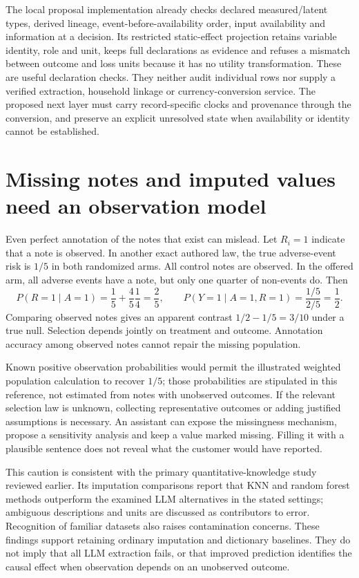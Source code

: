 The local proposal implementation already checks declared measured/latent
types, derived lineage, event-before-availability order, input availability
and information at a decision. Its restricted static-effect projection
retains variable identity, role and unit, keeps full declarations as evidence
and refuses a mismatch between outcome and loss units because it has no
utility transformation. These are useful declaration checks. They neither
audit individual rows nor supply a verified extraction, household linkage or
currency-conversion service.\citep{exec17_ontology_sources}
The proposed next layer must carry record-specific clocks and provenance
through the conversion, and preserve an explicit unresolved state when
availability or identity cannot be established.

\section{Missing notes and imputed values need an observation model}

Even perfect annotation of the notes that exist can mislead. Let
\(R_i=1\) indicate that a note is observed. In another exact authored law, the
true adverse-event risk is \(1/5\) in both randomized arms. All control notes
are observed. In the offered arm, all adverse events have a note, but only
one quarter of non-events do. Then
\[
 P(R=1\mid A=1)=\frac15+\frac45\frac14=\frac25,
 \qquad
 P(Y=1\mid A=1,R=1)=\frac{1/5}{2/5}=\frac12.
\]
Comparing observed notes gives an apparent contrast \(1/2-1/5=3/10\)
under a true null. Selection depends jointly on treatment and outcome.
Annotation accuracy among observed notes cannot repair the missing
population.\citep{exec17_ontology_oracle}

Known positive observation probabilities would permit the illustrated
weighted population calculation to recover \(1/5\); those probabilities are
stipulated in this reference, not estimated from notes with unobserved
outcomes. If the relevant selection law is unknown, collecting representative
outcomes or adding justified assumptions is necessary. An assistant can expose
the missingness mechanism, propose a sensitivity analysis and keep a value
marked missing. Filling it with a plausible sentence does not reveal what
the customer would have reported.

This caution is consistent with the primary quantitative-knowledge study
reviewed earlier. Its imputation comparisons report that KNN and random
forest methods outperform the examined LLM alternatives in the stated
settings; ambiguous descriptions and units are discussed as contributors to
error. Recognition of familiar datasets also raises contamination concerns.
\citep{v12_la_2402_07770} These findings support retaining ordinary imputation
and dictionary baselines. They do not imply that all LLM extraction fails,
or that improved prediction identifies the causal effect when observation
depends on an unobserved outcome.

